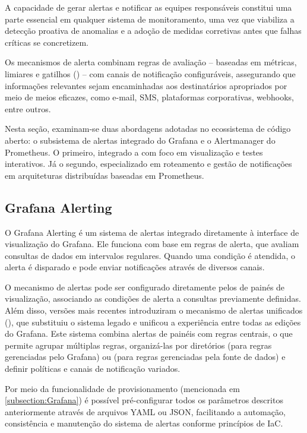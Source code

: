 A capacidade de gerar alertas e notificar as equipes responsáveis constitui uma parte essencial em qualquer sistema de monitoramento, uma vez que viabiliza a detecção proativa de anomalias e a adoção de medidas corretivas antes que falhas críticas se concretizem.

Os mecanismos de alerta combinam regras de avaliação -- baseadas em métricas, limiares e gatilhos () -- com canais de notificação configuráveis, assegurando que informações relevantes sejam encaminhadas aos destinatários apropriados por meio de meios eficazes, como e-mail, SMS, plataformas corporativas, webhooks, entre outros.

Nesta seção, examinam-se duas abordagens adotadas no ecossistema de código aberto: o subsistema de alertas integrado do Grafana e o Alertmanager do Prometheus. O primeiro, integrado a  com foco em visualização e testes interativos. Já o segundo, especializado em roteamento e gestão de notificações em arquiteturas distribuídas baseadas em Prometheus.

\subsection{Grafana Alerting}
\label{subsection:GrafanaAlerting}

O Grafana Alerting \citep{grafanaalerting2025} é um sistema de alertas integrado diretamente à interface de visualização do Grafana. Ele funciona com base em regras de alerta, que avaliam consultas de dados em intervalos regulares. Quando uma condição é atendida, o alerta é disparado e pode enviar notificações através de diversos canais.

O mecanismo de alertas pode ser configurado diretamente pelos de painés de visualização, associando as condições de alerta a consultas previamente definidas. Além disso, versões mais recentes introduziram o mecanismo de alertas unificados (), que substituiu o sistema legado e unificou a experiência entre todas as edições do Grafana. Este sistema combina alertas de painéis com regras centrais, o que permite agrupar múltiplas regras, organizá-las por diretórios (para regras gerenciadas pelo Grafana) ou  (para regras gerenciadas pela fonte de dados) e definir políticas e canais de notificação variados.

Por meio da funcionalidade de provisionamento (mencionada em \ref{subsection:Grafana}) é possível pré-configurar todos os parâmetros descritos anteriormente através de arquivos YAML ou JSON, facilitando a automação, consistência e manutenção do sistema de alertas conforme princípios de IaC.

